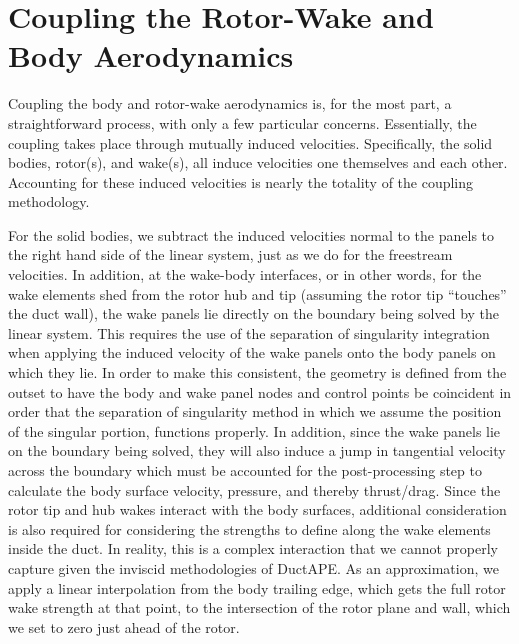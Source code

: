 

\section{Coupling the Rotor-Wake and Body Aerodynamics}

Coupling the body and rotor-wake aerodynamics is, for the most part, a straightforward process, with only a few particular concerns.
%
Essentially, the coupling takes place through mutually induced velocities.
%
Specifically, the solid bodies, rotor(s), and wake(s), all induce velocities one themselves and each other.
%
Accounting for these induced velocities is nearly the totality of the coupling methodology.


For the solid bodies, we subtract the induced velocities normal to the panels to the right hand side of the linear system, just as we do for the freestream velocities.
%
In addition, at the wake-body interfaces, or in other words, for the wake elements shed from the rotor hub and tip (assuming the rotor tip ``touches'' the duct wall), the wake panels lie directly on the boundary being solved by the linear system.
%
This requires the use of the separation of singularity integration when applying the induced velocity of the wake panels onto the body panels on which they lie.
%
In order to make this consistent, the geometry is defined from the outset to have the body and wake panel nodes and control points be coincident in order that the separation of singularity method in which we assume the position of the singular portion, functions properly.
%
In addition, since the wake panels lie on the boundary being solved, they will also induce a jump in tangential velocity across the boundary which must be accounted for the post-processing step to calculate the body surface velocity, pressure, and thereby thrust/drag.
%
Since the rotor tip and hub wakes interact with the body surfaces, additional consideration is also required for considering the strengths to define along the wake elements inside the duct.
%
In reality, this is a complex interaction that we cannot properly capture given the inviscid methodologies of DuctAPE.
%
As an approximation, we apply a linear interpolation from the body trailing edge, which gets the full rotor wake strength at that point, to the intersection of the rotor plane and wall, which we set to zero just ahead of the rotor.
%



